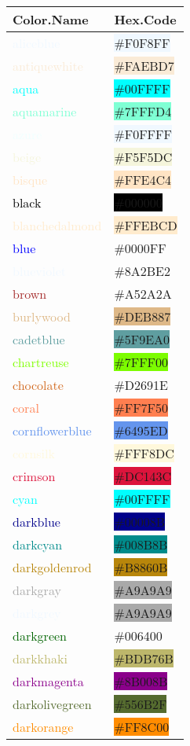 \documentclass[
]{article}
\begin{document}
\begin{longtable}[]{@{}ll@{}}
\toprule
Color.Name & Hex.Code\tabularnewline
\midrule
\endhead
\textcolor{aliceblue}{aliceblue} &
\colorbox{aliceblue}{\#F0F8FF}\tabularnewline
\textcolor{antiquewhite}{antiquewhite} &
\colorbox{antiquewhite}{\#FAEBD7}\tabularnewline
\textcolor{aqua}{aqua} & \colorbox{aqua}{\#00FFFF}\tabularnewline
\textcolor{aquamarine}{aquamarine} &
\colorbox{aquamarine}{\#7FFFD4}\tabularnewline
\textcolor{azure}{azure} & \colorbox{aliceblue}{\#F0FFFF}\tabularnewline
\textcolor{beige}{beige} & \colorbox{beige}{\#F5F5DC}\tabularnewline
\textcolor{bisque}{bisque} & \colorbox{bisque}{\#FFE4C4}\tabularnewline
\textcolor{black}{black} & \colorbox{black}{\#000000}\tabularnewline
\textcolor{blanchedalmond}{blanchedalmond} &
\colorbox{blanchedalmond}{\#FFEBCD}\tabularnewline
\textcolor{blue}{blue} & \colorbox{ao}{\#0000FF}\tabularnewline
\textcolor{aliceblue}{blueviolet} &
\colorbox{blue-violet}{\#8A2BE2}\tabularnewline
\textcolor{brown}{brown} & \colorbox{red-brown}{\#A52A2A}\tabularnewline
\textcolor{burlywood}{burlywood} &
\colorbox{burlywood}{\#DEB887}\tabularnewline
\textcolor{cadetblue}{cadetblue} &
\colorbox{cadetblue}{\#5F9EA0}\tabularnewline
\textcolor{chartreuse}{chartreuse} &
\colorbox{lawngreen}{\#7FFF00}\tabularnewline
\textcolor{chocolate}{chocolate} &
\colorbox{cinnamon}{\#D2691E}\tabularnewline
\textcolor{coral}{coral} & \colorbox{coral}{\#FF7F50}\tabularnewline
\textcolor{cornflowerblue}{cornflowerblue} &
\colorbox{cornflowerblue}{\#6495ED}\tabularnewline
\textcolor{cornsilk}{cornsilk} &
\colorbox{cornsilk}{\#FFF8DC}\tabularnewline
\textcolor{crimson}{crimson} &
\colorbox{crimson}{\#DC143C}\tabularnewline
\textcolor{cyan}{cyan} & \colorbox{aqua}{\#00FFFF}\tabularnewline
\textcolor{darkblue}{darkblue} &
\colorbox{darkblue}{\#00008B}\tabularnewline
\textcolor{darkcyan}{darkcyan} &
\colorbox{darkcyan}{\#008B8B}\tabularnewline
\textcolor{darkgoldenrod}{darkgoldenrod} &
\colorbox{darkgoldenrod}{\#B8860B}\tabularnewline
\textcolor{darkgray}{darkgray} &
\colorbox{darkgray}{\#A9A9A9}\tabularnewline
\textcolor{aliceblue}{darkgrey} &
\colorbox{darkgray}{\#A9A9A9}\tabularnewline
\textcolor{darkgreen}{darkgreen} &
\colorbox{pakistangreen}{\#006400}\tabularnewline
\textcolor{darkkhaki}{darkkhaki} &
\colorbox{darkkhaki}{\#BDB76B}\tabularnewline
\textcolor{darkmagenta}{darkmagenta} &
\colorbox{darkmagenta}{\#8B008B}\tabularnewline
\textcolor{darkolivegreen}{darkolivegreen} &
\colorbox{darkolivegreen}{\#556B2F}\tabularnewline
\textcolor{darkorange}{darkorange} &
\colorbox{darkorange}{\#FF8C00}\tabularnewline

\end{longtable}
\end{document}
